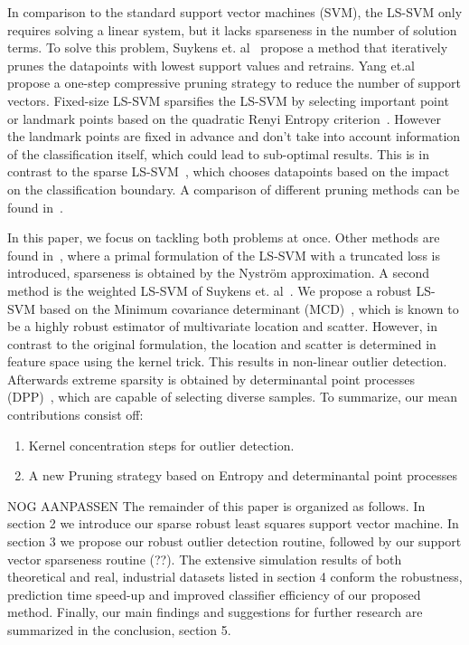 \documentclass[preprint,12pt]{elsarticle}
\begin{document}
	In comparison to the standard support vector machines (SVM), the LS-SVM only requires solving a linear system, but it lacks sparseness in the number of solution terms. To solve this problem, Suykens et. al~\cite{suykens2000sparse} propose a method that iteratively prunes the datapoints with lowest support values and retrains. Yang et.al~\cite{yang2014sparse} propose a one-step compressive pruning strategy to reduce the number of support vectors. Fixed-size LS-SVM sparsifies the LS-SVM by selecting important point or landmark points based on the quadratic Renyi Entropy criterion~\cite{suykens2002least}. However the landmark points are fixed in advance and don't take into account information of the classification itself, which could lead to sub-optimal results. This is in contrast to the sparse LS-SVM~\cite{suykens2000sparse}, which chooses datapoints based on the impact on the classification boundary. A comparison of different pruning methods can be found in~\cite{hoegaerts2004comparison}. 
	
	In this paper, we focus on tackling both problems at once.
	Other methods are found in~\cite{chen2018sparse}, where a primal formulation of the LS-SVM with a truncated loss is introduced, sparseness is obtained by the Nystr\"{o}m approximation. A second method is the weighted LS-SVM of Suykens et. al~\cite{suykens2002weighted}. We propose a robust LS-SVM based on the Minimum covariance determinant (MCD)~\cite{hubert2010minimum}, which is known to be a highly robust
	estimator of multivariate location and scatter. However, in contrast to the original formulation, the location and scatter is determined in feature space using the kernel trick. This results in non-linear outlier detection. Afterwards extreme sparsity is obtained by determinantal point processes (DPP)~\cite{kulesza2012determinantal}, which are capable of selecting diverse samples. To summarize, our mean contributions consist off:
	\begin{enumerate}
		\item Kernel concentration steps for outlier detection.
		\item A new Pruning strategy based on Entropy and determinantal point processes
	\end{enumerate}
	
	NOG AANPASSEN
	The remainder of this paper is organized as follows. In section 2 we introduce our sparse robust least squares support vector machine. In section 3 we propose our robust outlier detection routine, followed by our support vector sparseness routine (??). The extensive simulation results of both theoretical and real, industrial datasets listed in section 4 conform the robustness, prediction time speed-up and improved classifier efficiency of our proposed method. Finally, our main findings and suggestions for further research are summarized in the conclusion, section 5. 
	
\end{document}
